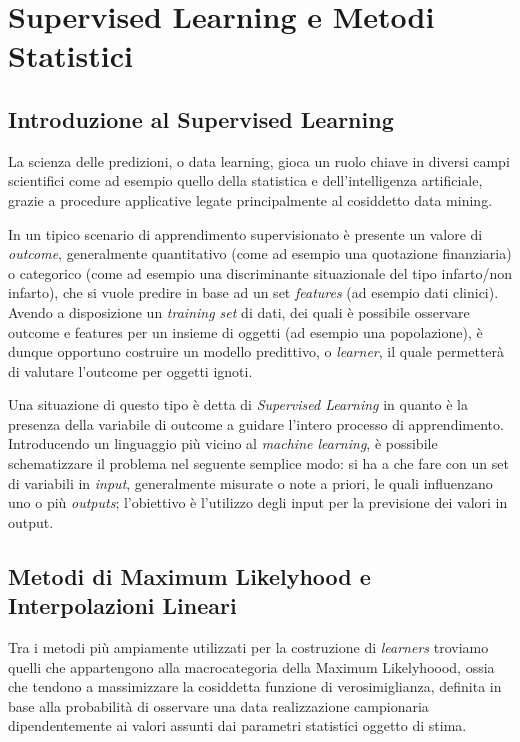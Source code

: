 \documentclass[a4paper]{report}
\begin{document}
\chapter{Supervised Learning e Metodi Statistici}

\section{Introduzione al Supervised Learning}
La scienza delle predizioni, o data learning, gioca un ruolo chiave in diversi campi scientifici come ad esempio quello della statistica e dell'intelligenza artificiale, grazie a procedure applicative legate principalmente al cosiddetto data mining.

In un tipico scenario di apprendimento supervisionato è presente un valore di \textit{outcome}, generalmente quantitativo (come ad esempio una quotazione finanziaria) o categorico (come ad esempio una discriminante situazionale del tipo infarto/non infarto), che si vuole predire in base ad un set \textit{features} (ad esempio dati clinici).
Avendo a disposizione un \textit{training set} di dati, dei quali è possibile osservare outcome e features per un insieme di oggetti (ad esempio una popolazione), è dunque opportuno costruire un modello predittivo, o \textit{learner}, il quale permetterà di valutare l'outcome per oggetti ignoti.

Una situazione di questo tipo è detta di \textit{Supervised Learning} in quanto è la presenza della variabile di outcome a guidare l'intero processo di apprendimento.
Introducendo un linguaggio più vicino al \textit{machine learning}, è possibile schematizzare il problema nel seguente semplice modo: si ha a che fare con un set di variabili in \textit{input}, generalmente misurate o note a priori, le quali influenzano uno o più \textit{outputs}; l'obiettivo è l'utilizzo degli input per la previsione dei valori in output.

\section{Metodi di Maximum Likelyhood e Interpolazioni Lineari}
Tra i metodi più ampiamente utilizzati per la costruzione di \textit{learners} troviamo quelli che appartengono alla macrocategoria della Maximum Likelyhoood, ossia che tendono a massimizzare la cosiddetta funzione di verosimiglianza, definita in base alla probabilità di osservare una data realizzazione campionaria dipendentemente ai valori assunti dai parametri statistici oggetto di stima.
\end{document}

